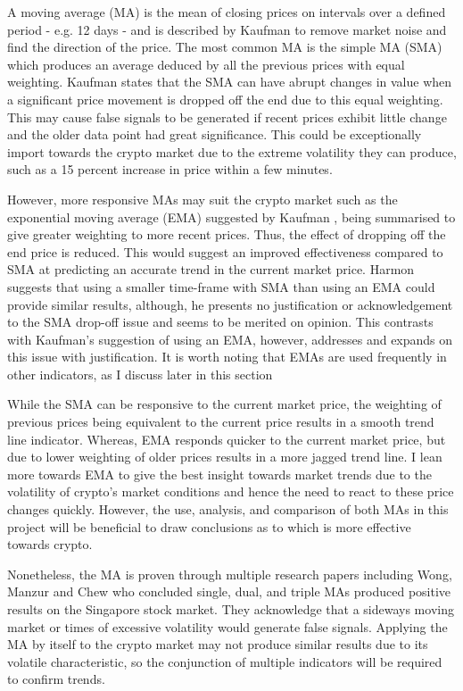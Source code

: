A moving average (MA) is the mean of closing prices on intervals over a defined period - e.g. 12 days - and is described by Kaufman \cite{BOOK:Kaufman:2013} to remove market noise and find the direction of the price. The most common MA is the simple MA (SMA) which produces an average deduced by all the previous prices with equal weighting. Kaufman \cite{BOOK:Kaufman:2013} states that the SMA can have abrupt changes in value when a significant price movement is dropped off the end due to this equal weighting. This may cause false signals to be generated if recent prices exhibit little change and the older data point had great significance. This could be exceptionally import towards the crypto market due to the extreme volatility they can produce, such as a 15 percent increase in price within a few minutes. 

However, more responsive MAs may suit the crypto market such as the exponential moving average (EMA) suggested by Kaufman \cite{BOOK:Kaufman:2013}, being summarised to give greater weighting to more recent prices. Thus, the effect of dropping off the end price is reduced. This would suggest an improved effectiveness compared to SMA at predicting an accurate trend in the current market price. Harmon \cite{BOOK:Harmon:2014} suggests that using a smaller time-frame with SMA than using an EMA could provide similar results, although, he presents no justification or acknowledgement to the SMA drop-off issue and seems to be merited on opinion. This contrasts with Kaufman's \cite{BOOK:Kaufman:2013} suggestion of using an EMA, however, addresses and expands on this issue with justification. It is worth noting that EMAs are used frequently in other indicators, as I discuss later in this section
    
While the SMA can be responsive to the current market price, the weighting of previous prices being equivalent to the current price results in a smooth trend line indicator. Whereas, EMA responds quicker to the current market price, but due to lower weighting of older prices results in a more jagged trend line. I lean more towards EMA to give the best insight towards market trends due to the volatility of crypto's market conditions and hence the need to react to these price changes quickly. However, the use, analysis, and comparison of both MAs in this project will be beneficial to draw conclusions as to which is more effective towards crypto.

Nonetheless, the MA is proven through multiple research papers including Wong, Manzur and Chew \cite{ART:Wong:2003} who concluded single, dual, and triple MAs produced positive results on the Singapore stock market. They acknowledge that a sideways moving market or times of excessive volatility would generate false signals. Applying the MA by itself to the crypto market may not produce similar results due to its volatile characteristic, so the conjunction of multiple indicators will be required to confirm trends.  


